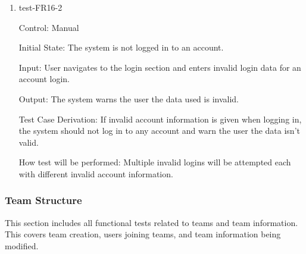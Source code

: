 \documentclass[12pt, titlepage]{article}
\begin{document}
\begin{enumerate}
  \item{test-FR16-2\\}

  Control: Manual

  Initial State: The system is not logged in to an account.

  Input: User navigates to the login section and enters invalid login data
  for an account login.

  Output: The system warns the user the data used is invalid.

  Test Case Derivation: If invalid account information is given when logging
  in, the system should not log in to any account and warn the user the data
  isn't valid.

  How test will be performed: Multiple invalid logins will be attempted each
  with different invalid account information.








\end{enumerate}

\subsubsection{Team Structure}

This section includes all functional tests related to teams and team
information. This covers team creation, users joining teams, and team
information being modified.
\end{document}
